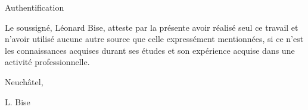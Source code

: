\vspace*{200px}

\large{Authentification}

\begin{normalsize}


Le soussigné, Léonard Bise, atteste par la présente avoir réalisé seul ce travail et n'avoir utilisé aucune autre source que celle expressément mentionnées, si ce n'est les connaissances acquises durant ses études et son expérience acquise dans une activité professionnelle.

Neuchâtel, 

\begin{flushright}
L. Bise
\end{flushright}

\end{normalsize}